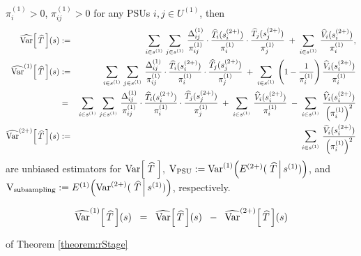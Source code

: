 \begin{theorem}
$\pi^{(1)}_{i} > 0$, $\pi^{(1)}_{ij} > 0$ for any \textnormal{PSU}s $i,j \in U^{(1)}$,
then
\begin{eqnarray*}
\widehat{\textnormal{Var}}\!\left[\,\widehat{T}\,\right]\!(s)
&:=&
\sum_{i\in s^{(1)}}\,\sum_{j\in s^{(1)}}\,
\dfrac{\Delta^{(1)}_{ij}}{\pi^{(1)}_{ij}}
\cdot
\dfrac{\widehat{T}_{i}(s^{(2+)}_{i})}{\pi^{(1)}_{i}}
\cdot
\dfrac{\widehat{T}_{j}(s^{(2+)}_{j})}{\pi^{(1)}_{j}}
\;+\;
\sum_{i\in s^{(1)}}\,\dfrac{\widehat{V}_{i}(s^{(2+)}_{i})}{\pi^{(1)}_{i}},
\\
\widehat{\textnormal{Var}}^{(1)}\!\left[\,\widehat{T}\,\right]\!(s)
&:=&
\sum_{i\in s^{(1)}}\,\sum_{j\in s^{(1)}}\,
\dfrac{\Delta^{(1)}_{ij}}{\pi^{(1)}_{ij}}
\cdot
\dfrac{\widehat{T}_{i}(s^{(2+)}_{i})}{\pi^{(1)}_{i}}
\cdot
\dfrac{\widehat{T}_{j}(s^{(2+)}_{j})}{\pi^{(1)}_{j}}
\;+\;
\sum_{i\in s^{(1)}}\,\left(1 - \dfrac{1}{\pi^{(1)}_{i}}\right)\dfrac{\widehat{V}_{i}(s^{(2+)}_{i})}{\pi^{(1)}_{i}}
\\
&=&
\sum_{i\in s^{(1)}}\,\sum_{j\in s^{(1)}}\,
\dfrac{\Delta^{(1)}_{ij}}{\pi^{(1)}_{ij}}
\cdot
\dfrac{\widehat{T}_{i}(s^{(2+)}_{i})}{\pi^{(1)}_{i}}
\cdot
\dfrac{\widehat{T}_{j}(s^{(2+)}_{j})}{\pi^{(1)}_{j}}
\;+\;
\sum_{i\in s^{(1)}}\,\dfrac{\widehat{V}_{i}(s^{(2+)}_{i})}{\pi^{(1)}_{i}}
\;-\;
\sum_{i\in s^{(1)}}\,\dfrac{\widehat{V}_{i}(s^{(2+)}_{i})}{\left(\pi^{(1)}_{i}\right)^{2}}
\\
\widehat{\textnormal{Var}}^{(2+)}\!\left[\,\widehat{T}\,\right]\!(s)
&:=&
\sum_{i\in s^{(1)}}\,\dfrac{\widehat{V}_{i}(s^{(2+)}_{i})}{\left(\pi^{(1)}_{i}\right)^{2}}
\end{eqnarray*}
are unbiased estimators for
$\textnormal{Var}\!\left[\;\widehat{T}\;\right]$,\;
$\textnormal{V}_{\textnormal{PSU}} := \textnormal{Var}^{(1)}\!\left(E^{(2+)}(\,\left.\widehat{T}\,\right\vert s^{(1)})\right)$,
and\;
$\textnormal{V}_{\textnormal{subsampling}} := E^{(1)}\!\left(\textnormal{Var}^{(2+)}(\,\left.\widehat{T}\,\right\vert s^{(1)})\right)$,
respectively.
\end{theorem}

\begin{corollary}
\begin{equation}
\widehat{\textnormal{Var}}^{(1)}\!\left[\,\widehat{T}\,\right]\!(s)
\;\;=\;\;
\widehat{\textnormal{Var}}\!\left[\,\widehat{T}\,\right]\!(s)
\;\;-\;\;
\widehat{\textnormal{Var}}^{(2+)}\!\left[\,\widehat{T}\,\right]\!(s)
\end{equation}
\end{corollary}

\proof\!\!\!\!\!\!of Theorem \ref{theorem:rStage}

